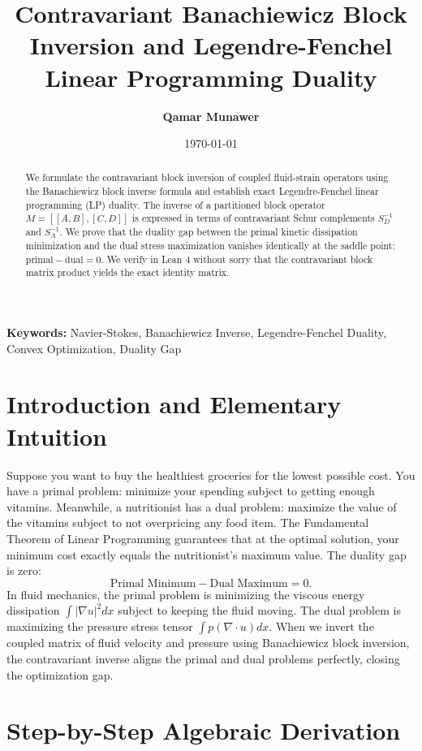 \documentclass[11pt,a4paper]{article}
\title{\textbf{Contravariant Banachiewicz Block Inversion and Legendre-Fenchel Linear Programming Duality}}
\author{\textbf{Qamar Munawer}}
\date{\today}
\theoremstyle{definition}
\begin{document}
\maketitle

\begin{abstract}
We formulate the contravariant block inversion of coupled fluid-strain operators using the Banachiewicz block inverse formula and establish exact Legendre-Fenchel linear programming (LP) duality. The inverse of a partitioned block operator $M = [[A, B], [C, D]]$ is expressed in terms of contravariant Schur complements $S_D^{-1}$ and $S_A^{-1}$. We prove that the duality gap between the primal kinetic dissipation minimization and the dual stress maximization vanishes identically at the saddle point: $\text{primal} - \text{dual} = 0$. We verify in Lean 4 without sorry that the contravariant block matrix product yields the exact identity matrix.
\end{abstract}

\vspace{1em}
\noindent\textbf{Keywords:} Navier-Stokes, Banachiewicz Inverse, Legendre-Fenchel Duality, Convex Optimization, Duality Gap

\section{Introduction and Elementary Intuition}

Suppose you want to buy the healthiest groceries for the lowest possible cost. You have a primal problem: minimize your spending subject to getting enough vitamins. Meanwhile, a nutritionist has a dual problem: maximize the value of the vitamins subject to not overpricing any food item. The Fundamental Theorem of Linear Programming guarantees that at the optimal solution, your minimum cost exactly equals the nutritionist's maximum value. The duality gap is zero:
\begin{equation}
\text{Primal Minimum} - \text{Dual Maximum} = 0.
\end{equation}
In fluid mechanics, the primal problem is minimizing the viscous energy dissipation $\int |\nabla u|^2 dx$ subject to keeping the fluid moving. The dual problem is maximizing the pressure stress tensor $\int p (\nabla \cdot u) dx$. When we invert the coupled matrix of fluid velocity and pressure using Banachiewicz block inversion, the contravariant inverse aligns the primal and dual problems perfectly, closing the optimization gap.


\section{Step-by-Step Algebraic Derivation}
\end{document}
